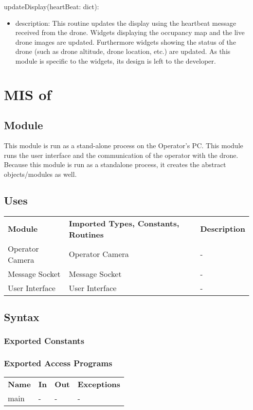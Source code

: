 \documentclass[12pt, titlepage]{article}
\begin{document}
\noindent updateDisplay(heartBeat: dict):
\begin{itemize}
\item description: This routine updates the display using the heartbeat message received from the drone. Widgets displaying the occupancy map and the live drone images are updated. Furthermore widgets showing the status of the drone (such as drone altitude, drone location, etc.) are updated. As this module is specific to the widgets, its design is left to the developer.
\end{itemize}
\newpage

\section{MIS of } \label{MAIN_INTERFACE} 
\subsection{Module}
This module is run as a stand-alone process on the Operator's PC. This module runs the user interface and the communication of the operator with the drone. Because this module is run as a standalone process, it creates the abstract objects/modules as well.

\subsection{Uses}
\begin{center}
\begin{tabular}{p{2 cm} p{5cm} p{6.5cm} } 
\hline
\textbf{Module} & \textbf{Imported Types, Constants, Routines} & \textbf{Description} \\
Operator Camera & Operator Camera & - \\
Message Socket & Message Socket & - \\
User Interface & User Interface & - \\
\hline
\hline
\end{tabular}
\end{center}
\subsection{Syntax}
\subsubsection{Exported Constants}
\subsubsection{Exported Access Programs}
\begin{center}
\begin{tabular}{p{3.5cm} p{2.5cm} p{2.5cm} p{5cm}}
\hline
\textbf{Name} & \textbf{In} & \textbf{Out} & \textbf{Exceptions} \\
main & - & - & - \\
\hline
\hline
\end{tabular}
\end{center}
\end{document}
